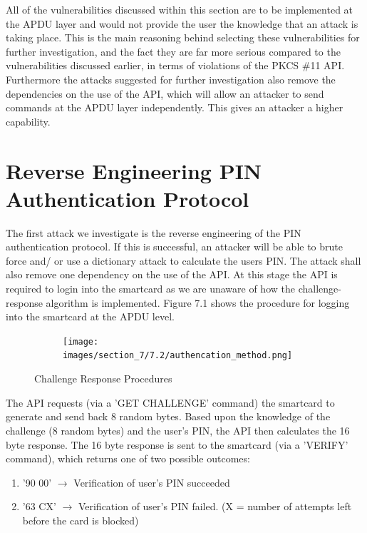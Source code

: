 \documentclass[bsc,frontabs,twoside,singlespacing,parskip,deptreport]{infthesis}     %
\begin{document}
All of the vulnerabilities discussed within this section are to be implemented at the APDU layer and would not provide the user the knowledge that an attack is taking place. This is the main reasoning behind selecting these vulnerabilities for further investigation, and the fact they are far more serious compared to the vulnerabilities discussed earlier, in terms of violations of the PKCS \#11 API. Furthermore the attacks suggested for further investigation also remove the dependencies on the use of the API, which will allow an attacker to send commands at the APDU layer independently. This gives an attacker a higher capability.

\section{Reverse Engineering PIN Authentication Protocol}
The first attack we investigate is the reverse engineering of the PIN authentication protocol. If this is successful, an attacker will be able to brute force and/ or use a dictionary attack to calculate the users PIN. The attack shall also remove one dependency on the use of the API. At this stage the API is required to login into the smartcard as we are unaware of how the challenge-response algorithm is implemented. Figure 7.1 shows the procedure for logging into the smartcard at the APDU level.

\begin{figure}[H]
\centering
\begin{subfigure}{1\textwidth}
  \texttt{[image: images/section\_7/7.2/authencation\_method.png]}
\end{subfigure}
\caption{Challenge Response Procedures}
\end{figure}

The API requests (via a 'GET CHALLENGE' command) the smartcard to generate and send back 8 random bytes. Based upon the knowledge of the challenge (8 random bytes) and the user's PIN, the API then calculates the 16 byte response. The 16 byte response is sent to the smartcard (via a 'VERIFY' command), which returns one of two possible outcomes:
\begin{enumerate}
\item '90 00' $\rightarrow$ Verification of user's PIN succeeded
\item '63 CX' $\rightarrow$ Verification of user's PIN failed. (X = number of attempts left before the card is blocked)\\
\end{enumerate}
\end{document}

